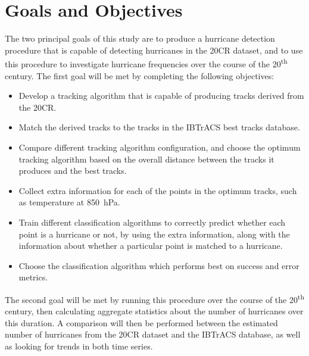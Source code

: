 \documentclass[pdftex,12pt,a4paper]{report}
\newcommand{\ts}{\textsuperscript}
\begin{document}

\section{Goals and Objectives}

The two principal goals of this study are to produce a hurricane detection procedure that is capable
of detecting hurricanes in the 20CR dataset, and to use this procedure to investigate hurricane
frequencies over the course of the 20\ts{th} century. The first goal will be met by completing the
following objectives:

\begin{itemize}
    \item Develop a tracking algorithm that is capable of producing tracks derived from the 20CR.
    \item Match the derived tracks to the tracks in the IBTrACS best tracks database.
    \item Compare different tracking algorithm configuration, and choose the optimum tracking
        algorithm based on the overall distance between the tracks it produces and the best tracks.
    \item Collect extra information for each of the points in the optimum tracks, such as
        temperature at \SI{850}{hPa}.
    \item Train different classification algorithms to correctly predict whether each point is a
        hurricane or not, by using the extra information, along with the information about whether a
        particular point is matched to a hurricane.
    \item Choose the classification algorithm which performs best on success and error metrics.
\end{itemize}

The second goal will be met by running this procedure over the course of the 20\ts{th} century, then
calculating aggregate statistics about the number of hurricanes over this duration. A comparison
will then be performed between the estimated number of hurricanes from the 20CR dataset and the
IBTrACS database, as well as looking for trends in both time series.
\end{document}
